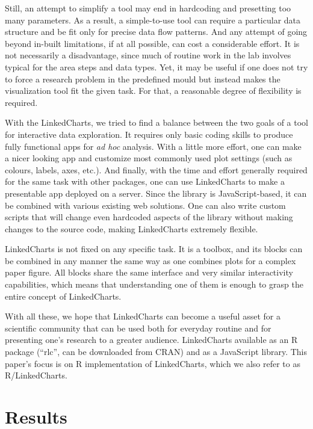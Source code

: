 \documentclass[twocolumn,10pt]{article}
\begin{document}
Still, an attempt to simplify a tool may end in hardcoding and presetting too many parameters. As a result, a simple-to-use tool can require a particular data structure and be fit only for precise data flow patterns. And any attempt of going beyond in-built limitations, if at all possible, can cost a considerable effort. It is not necessarily a disadvantage, since much of routine work in the lab involves typical for the area steps and data types. Yet, it may be useful if one does not try to force a research problem in the predefined mould but instead makes the visualization tool fit the given task. For that, a reasonable degree of flexibility is required.

With the LinkedCharts, we tried to find a balance between the two goals of a tool for interactive data exploration. It requires only basic coding skills to produce fully functional apps for \emph{ad hoc} analysis. With a little more effort, one can make a nicer looking app and customize most commonly used plot settings (such as colours, labels, axes, etc.). And finally, with the time and effort generally required for the same task with other packages, one can use LinkedCharts to make a presentable app deployed on a server. Since the library is JavaScript-based, it can be combined with various existing web solutions. One can also write custom scripts that will change even hardcoded aspects of the library without making changes to the source code, making LinkedCharts extremely flexible. 

LinkedCharts is not fixed on any specific task. It is a toolbox, and its blocks can be combined in any manner the same way as one combines plots for a complex paper figure. All blocks share the same interface and very similar interactivity capabilities, which means that understanding one of them is enough to grasp the entire concept of LinkedCharts.

With all these, we hope that LinkedCharts can become a useful asset for a scientific community that can be used both for everyday routine and for presenting one's research to a greater audience. LinkedCharts available as an R package (``rlc'', can be downloaded from CRAN) and as a JavaScript library. This paper's focus is on R implementation of LinkedCharts, which we also refer to as R/LinkedCharts. 

\section{Results}
\end{document}

